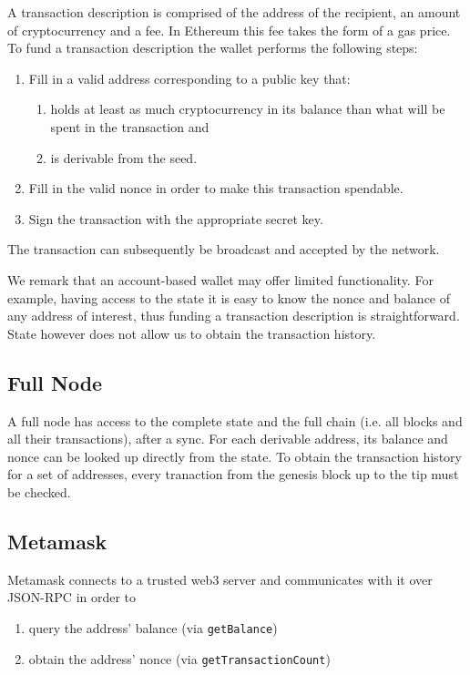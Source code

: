 \documentclass[sigconf,authordraft]{acmart}
\begin{document}
A transaction description is comprised of the address of the recipient, an amount of cryptocurrency and a fee. In Ethereum this fee takes the form of a gas price.
To fund a transaction description the wallet performs the following steps:

\begin{enumerate}
    \item Fill in a valid address corresponding to a public key that:
    \begin{enumerate}
        \item holds at least as much cryptocurrency in its balance than what will be spent in the transaction and
        \item is derivable from the seed.
    \end{enumerate}
    \item Fill in the valid nonce in order to make this transaction spendable.
    \item Sign the transaction with the appropriate secret key.
\end{enumerate}

The transaction can subsequently be broadcast and accepted by the network.

We remark that an account-based wallet may offer limited functionality. For example, having access to the state it is easy to know the nonce and balance of any address of interest, thus funding a transaction description is straightforward. State however does not allow us to obtain the transaction history.

\subsection{Full Node}
A full node has access to the complete state and the full chain (i.e. all blocks and all their transactions), after a sync. For each derivable address, its balance and nonce can be looked up directly from the state. To obtain the transaction history for a set of addresses, every tranaction from the genesis block up to the tip must be checked.

\subsection{Metamask}
Metamask connects to a trusted web3 server and communicates with it over JSON-RPC in order to
\begin{enumerate}
    \item query the address' balance (via \texttt{getBalance})
    \item obtain the address' nonce (via \texttt{getTransactionCount})
\end{enumerate}
\end{document}
